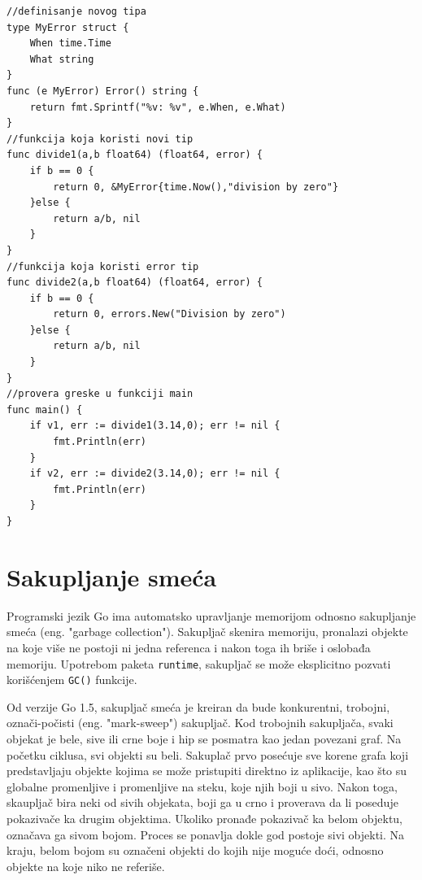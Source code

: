 \documentclass[12pt,oneside]{memoir}
\begin{document}
\begin{center}
\begin{lstlisting}[caption=Primer koji demonstrira upravljanje greškama, label={lst:error},  backgroundcolor=\color{background}]
//definisanje novog tipa
type MyError struct {
	When time.Time
	What string
}
func (e MyError) Error() string {
	return fmt.Sprintf("%v: %v", e.When, e.What)
}
//funkcija koja koristi novi tip
func divide1(a,b float64) (float64, error) {
	if b == 0 {
		return 0, &MyError{time.Now(),"division by zero"}
	}else {
		return a/b, nil
	}
}
//funkcija koja koristi error tip
func divide2(a,b float64) (float64, error) {
	if b == 0 {
		return 0, errors.New("Division by zero")
	}else {
		return a/b, nil
	}
}
//provera greske u funkciji main
func main() {
	if v1, err := divide1(3.14,0); err != nil {
		fmt.Println(err)				
	}
	if v2, err := divide2(3.14,0); err != nil {
		fmt.Println(err)			
	}
}
\end{lstlisting}
\end{center}
 
\section{Sakupljanje smeća}

Programski jezik Go ima automatsko upravljanje memorijom odnosno sakupljanje smeća (eng. "garbage collection"). Sakupljač skenira memoriju, pronalazi objekte na koje više ne postoji ni jedna referenca i nakon toga ih briše i oslobađa memoriju. Upotrebom paketa \texttt{runtime}, sakupljač se može eksplicitno pozvati korišćenjem \texttt{GC()} funkcije. 

Od verzije Go 1.5, sakupljač smeća\cite{garbage} je kreiran da bude konkurentni, trobojni, označi-počisti (eng. "mark-sweep") sakupljač. Kod trobojnih sakupljača, svaki objekat je bele, sive ili crne boje i hip se posmatra kao jedan povezani graf. Na početku ciklusa, svi objekti su beli. Sakuplač prvo posećuje sve korene grafa koji predstavljaju objekte kojima se može pristupiti direktno iz aplikacije, kao što su globalne promenljive i promenljive na steku, koje njih boji u sivo. Nakon toga, skaupljač bira neki od sivih objekata, boji ga u crno i proverava da li poseduje pokazivače ka drugim objektima. Ukoliko pronađe pokazivač ka belom objektu, označava ga sivom bojom. Proces se ponavlja dokle god postoje sivi objekti. Na kraju, belom bojom su označeni objekti do kojih nije moguće doći, odnosno objekte na koje niko ne referiše.
\end{document}
